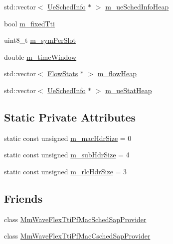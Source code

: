 \begin{DoxyCompactItemize}
\item 
std\+::vector$<$ \hyperlink{structns3_1_1MmWaveFlexTtiPfMacScheduler_1_1UeSchedInfo}{Ue\+Sched\+Info} $\ast$ $>$ \hyperlink{classns3_1_1MmWaveFlexTtiPfMacScheduler_a6ff1c1d70ef3c05d689831db0cd58dbd}{m\+\_\+ue\+Sched\+Info\+Heap}
\item 
bool \hyperlink{classns3_1_1MmWaveFlexTtiPfMacScheduler_a6a5564a538a97259df9ba0cb60646989}{m\+\_\+fixed\+Tti}
\item 
uint8\+\_\+t \hyperlink{classns3_1_1MmWaveFlexTtiPfMacScheduler_a88b84e4ed24fb0a3576b588bb779001e}{m\+\_\+sym\+Per\+Slot}
\item 
double \hyperlink{classns3_1_1MmWaveFlexTtiPfMacScheduler_adc8b66b1890b4ba9d14f1d294af36b07}{m\+\_\+time\+Window}
\item 
std\+::vector$<$ \hyperlink{structns3_1_1MmWaveFlexTtiPfMacScheduler_1_1FlowStats}{Flow\+Stats} $\ast$ $>$ \hyperlink{classns3_1_1MmWaveFlexTtiPfMacScheduler_a376eaf1c328d3a6b91d0b5c5bae16315}{m\+\_\+flow\+Heap}
\item 
std\+::vector$<$ \hyperlink{structns3_1_1MmWaveFlexTtiPfMacScheduler_1_1UeSchedInfo}{Ue\+Sched\+Info} $\ast$ $>$ \hyperlink{classns3_1_1MmWaveFlexTtiPfMacScheduler_afa463c768b5a2c1447cdf48daa3cf412}{m\+\_\+ue\+Stat\+Heap}
\end{DoxyCompactItemize}
\subsection*{Static Private Attributes}
\begin{DoxyCompactItemize}
\item 
static const unsigned \hyperlink{classns3_1_1MmWaveFlexTtiPfMacScheduler_a7440344a9aa05bc08ad44a93457fd13e}{m\+\_\+mac\+Hdr\+Size} = 0
\item 
static const unsigned \hyperlink{classns3_1_1MmWaveFlexTtiPfMacScheduler_a1087fd886396487dcacf4282b051e044}{m\+\_\+sub\+Hdr\+Size} = 4
\item 
static const unsigned \hyperlink{classns3_1_1MmWaveFlexTtiPfMacScheduler_acf20148d6bea14219763a6e77b219d0a}{m\+\_\+rlc\+Hdr\+Size} = 3
\end{DoxyCompactItemize}
\subsection*{Friends}
\begin{DoxyCompactItemize}
\item 
class \hyperlink{classns3_1_1MmWaveFlexTtiPfMacScheduler_aef955c2bb9f951f50a0d6fe6224d48fb}{Mm\+Wave\+Flex\+Tti\+Pf\+Mac\+Sched\+Sap\+Provider}
\item 
class \hyperlink{classns3_1_1MmWaveFlexTtiPfMacScheduler_a64c51265d48561bfda822a01ffbfab03}{Mm\+Wave\+Flex\+Tti\+Pf\+Mac\+Csched\+Sap\+Provider}
\end{DoxyCompactItemize}

